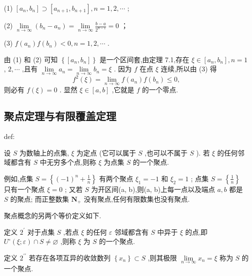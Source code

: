 (1) \(\left\lbrack  {{a}_{n},{b}_{n}}\right\rbrack   \supset  \left\lbrack  {{a}_{n + 1},{b}_{n + 1}}\right\rbrack  ,n = 1,2,\cdots\) ;

(2) \(\mathop{\lim }\limits_{{n \rightarrow  \infty }}\left( {{b}_{n} - {a}_{n}}\right)  = \mathop{\lim }\limits_{{n \rightarrow  \infty }}\frac{b - a}{{2}^{n - 1}} = 0\) ；

(3) \(f\left( {a}_{n}\right) f\left( {b}_{n}\right)  < 0,n = 1,2,\cdots\) .

由 (1) 和 (2) 可知 \(\left\{  \left\lbrack  {{a}_{n},{b}_{n}}\right\rbrack  \right\}\) 是一个区间套,由定理 7.1,存在 \(\xi  \in  \left\lbrack  {{a}_{n},{b}_{n}}\right\rbrack  ,n = 1\) , \(2,\cdots\) ,且有 \(\mathop{\lim }\limits_{{n \rightarrow  \infty }}{a}_{n} = \mathop{\lim }\limits_{{n \rightarrow  \infty }}{b}_{n} = \xi\) . 因为 \(f\) 在点 \(\xi\) 连续,所以由 (3) 得
\[
{f}^{2}\left( \xi \right)  = \mathop{\lim }\limits_{{n \rightarrow  \infty }}f\left( {a}_{n}\right) f\left( {b}_{n}\right)  \leq  0,
\]
则必有 \(f\left( \xi \right)  = 0\) . 显然 \(\xi  \in  \left\lbrack  {a,b}\right\rbrack\) ,它就是 \(f\) 的一个零点.

\subsection{聚点定理与有限覆盖定理}

\begin{definition}{}{def:}

\end{definition}
设 \(S\) 为数轴上的点集, \(\xi\) 为定点 (它可以属于 \(S\) ,也可以不属于 \(S\) ). 若 \(\xi\) 的任何邻域都含有 \(S\) 中无穷多个点,则称 \(\xi\) 为点集 \(S\) 的一个聚点.

例如,点集 \(S = \left\{  {{\left( -1\right) }^{n} + \frac{1}{n}}\right\}\) 有两个聚点 \({\xi }_{1} =  - 1\) 和 \({\xi }_{2} = 1\) ; 点集 \(S = \left\{  \frac{1}{n}\right\}\) 只有一个聚点 \(\xi  = 0\) ; 又若 \(S\) 为开区间(a, b),则(a, b)上每一点以及端点 \(a,b\) 都是 \(S\) 的聚点; 而正整数集 \({\mathbf{N}}_{ + }\) 没有聚点,任何有限数集也没有聚点.

聚点概念的另两个等价定义如下.

定义 \({2}^{\prime }\) 对于点集 \(S\) ,若点 \(\xi\) 的任何 \(\varepsilon\) 邻域都含有 \(S\) 中异于 \(\xi\) 的点,即 \({U}^{ \circ  }\left( {\xi ;\varepsilon }\right)  \cap  S \neq  \varnothing\) ,则称 \(\xi\) 为 \(S\) 的一个聚点.

定义 \({2}^{\prime \prime }\) 若存在各项互异的收敛数列 \(\left\{  {x}_{n}\right\}   \subset  S\) ,则其极限 \(\mathop{\lim }\limits_{{n \rightarrow  \infty }}{x}_{n} = \xi\) 称为 \(S\) 的一个聚点.

